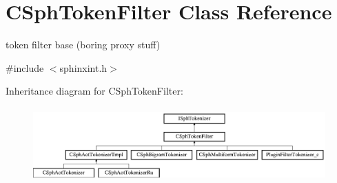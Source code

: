 \hypertarget{classCSphTokenFilter}{\section{C\-Sph\-Token\-Filter Class Reference}
\label{classCSphTokenFilter}
}


token filter base (boring proxy stuff)  




{\ttfamily \#include $<$sphinxint.\-h$>$}

Inheritance diagram for C\-Sph\-Token\-Filter\-:\begin{figure}[H]
\begin{center}
\leavevmode
\includegraphics[height=2.835443cm]{classCSphTokenFilter}
\end{center}
\end{figure}

